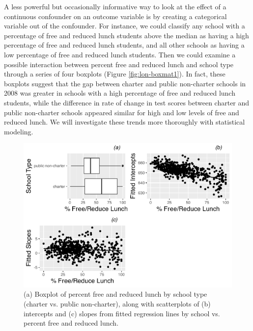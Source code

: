 \documentclass[
]{krantz}
\begin{document}
A less powerful but occasionally informative way to look at the effect of a continuous confounder on an outcome variable is by creating a categorical variable out of the confounder. For instance, we could classify any school with a percentage of free and reduced lunch students above the median as having a high percentage of free and reduced lunch students, and all other schools as having a low percentage of free and reduced lunch students. Then we could examine a possible interaction between percent free and reduced lunch and school type through a series of four boxplots (Figure \ref{fig:lon-boxmat1}). In fact, these boxplots suggest that the gap between charter and public non-charter schools in 2008 was greater in schools with a high percentage of free and reduced lunch students, while the difference in rate of change in test scores between charter and public non-charter schools appeared similar for high and low levels of free and reduced lunch. We will investigate these trends more thoroughly with statistical modeling.

\begin{figure}

{\centering \includegraphics[width=0.6\linewidth]{bookdown-BeyondMLR_files/figure-latex/lon-boxcatmat1-1} 

}

\caption{(a) Boxplot of percent free and reduced lunch by school type (charter vs. public non-charter), along with scatterplots of (b) intercepts and (c) slopes from fitted regression lines by school vs. percent free and reduced lunch.}\label{fig:lon-boxcatmat1}
\end{figure}
\end{document}
